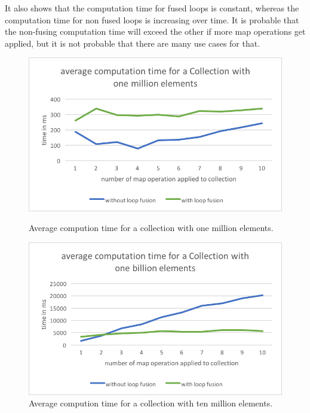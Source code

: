 \documentclass[runningheads,a4paper]{llncs}
\begin{document}
It also shows that the computation time for fused loops is constant, whereas the computation time for non fused loops is increasing over time.
It is probable that the non-fusing computation time will exceed the other if more map operations get applied, but it is not probable that there are many use cases for that.
\begin{figure}[ht]
  \centering
  \begin{minipage}[b]{0.49\textwidth}
    \includegraphics[width=\textwidth]{graphics/million.png}
    \caption{Average compution time for a collection with one million elements.}
    \label{fig:million}
  \end{minipage}
  \hfill
  \begin{minipage}[b]{0.49\textwidth}
    \includegraphics[width=\textwidth]{graphics/billion.png}
    \caption{Average compution time for a collection with ten million elements.}
    \label{fig:ten million}
  \end{minipage}
\end{figure}
\\
\end{document}
